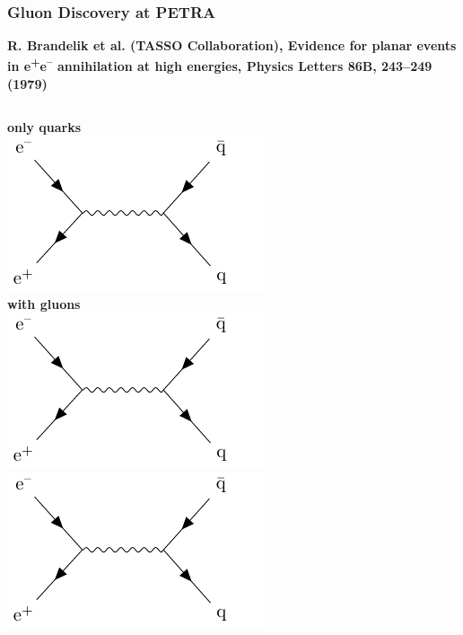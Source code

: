 \documentclass[10pt,t]{beamer}
\begin{document}
\begin{frame}
\frametitle{Gluon Discovery at PETRA}
\vspace*{-2.6\baselineskip}
\alert{\bfseries\footnotesize R. Brandelik et al. (TASSO Collaboration), Evidence for planar events in e\textsuperscript{+}e\textsuperscript{--} annihilation at high energies, Physics Letters 86B, 243--249 (1979)}
\vspace*{\baselineskip}
\begin{columns}
    \textbf{only quarks} \\
    \includegraphics[width=\textwidth,page=1]{gluon-feynman} \\[1ex]
    \textbf{with gluons} \\
    \includegraphics[width=\textwidth,page=2]{gluon-feynman} \\
    \includegraphics[width=\textwidth,page=3]{gluon-feynman} \\

\end{columns}
\end{frame}
\end{document}
